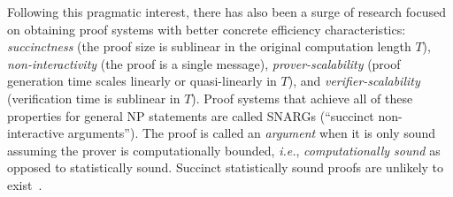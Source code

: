 Following this pragmatic interest, there has also been a surge of research focused on obtaining proof systems with better concrete efficiency characteristics: \emph{succinctness} (the proof size is sublinear in the original computation length $T$), \emph{non-interactivity} (the proof is a single message), \emph{prover-scalability} (proof generation time scales linearly or quasi-linearly in $T$), and \emph{verifier-scalability} (verification time is sublinear in $T$). Proof systems that achieve all of these properties for general NP statements %
are called SNARGs (``succinct non-interactive arguments''). 
The proof is called an \emph{argument} when it is only sound assuming the prover is computationally bounded, \emph{i.e.}, \emph{computationally sound} as opposed to statistically sound. 
Succinct statistically sound proofs are unlikely to exist~\cite{CC:GolVadWig02,ICALP:Wee05}.

